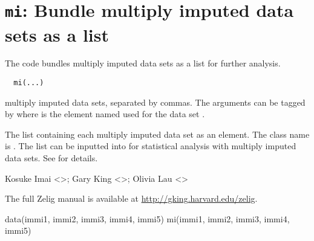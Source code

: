  \section{{\tt mi}: Bundle multiply imputed data sets as a list}\label{ss:mi}
\begin{Description}\relax
The code  bundles multiply imputed data sets as a
list for further analysis.
\end{Description}
\begin{Usage}
\begin{verbatim}
  mi(...)
\end{verbatim}
\end{Usage}
\begin{Arguments}
\begin{ldescription}
\item[\code{...}] multiply imputed data sets, separated by commas. The
arguments can be tagged by  where  is the
element named used for the data set .
\end{ldescription}
\end{Arguments}
\begin{Value}
The list containing each multiply imputed data set as an
element. The class name is . The list can be inputted into
 for statistical analysis with multiply imputed data
sets. See  for details.
\end{Value}
\begin{Author}\relax
Kosuke Imai <>; Gary King
<>; Olivia Lau <>
\end{Author}
\begin{SeeAlso}\relax
The full Zelig manual is available at
\url{http://gking.harvard.edu/zelig}.
\end{SeeAlso}
\begin{Examples}
\begin{ExampleCode}
  data(immi1, immi2, immi3, immi4, immi5)
  mi(immi1, immi2, immi3, immi4, immi5)
\end{ExampleCode}
\end{Examples}


